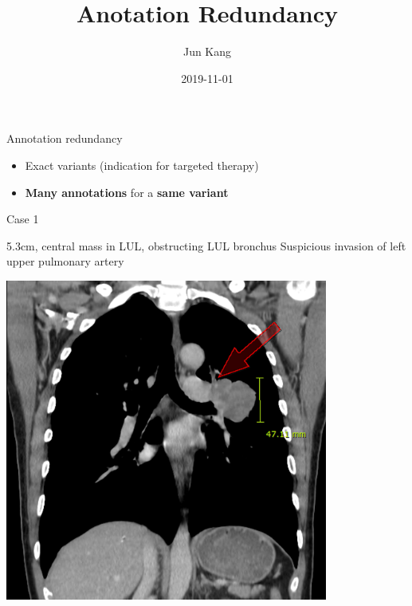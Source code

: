 \documentclass[
  ignorenonframetext,
]{beamer}
\title{Anotation Redundancy}
\author{Jun Kang}
\date{2019-11-01}
\providecommand{\tightlist}{%
  \setlength{\itemsep}{0pt}\setlength{\parskip}{0pt}}
\begin{document}
\frame{\titlepage}

\begin{frame}{Annotation redundancy}
\protect\hypertarget{annotation-redundancy}{}

\begin{itemize}
\tightlist
\item
  Exact variants (indication for targeted therapy)\\
\item
  \textbf{Many annotations} for a \textbf{same variant}
\end{itemize}

\end{frame}

\begin{frame}{Case 1}
\protect\hypertarget{case-1}{}

5.3cm, central mass in LUL, obstructing LUL bronchus Suspicious invasion
of left upper pulmonary artery

\includegraphics[width=\textwidth,height=4.16667in]{assets/img/chest_ct.png}

\end{frame}
\end{document}
